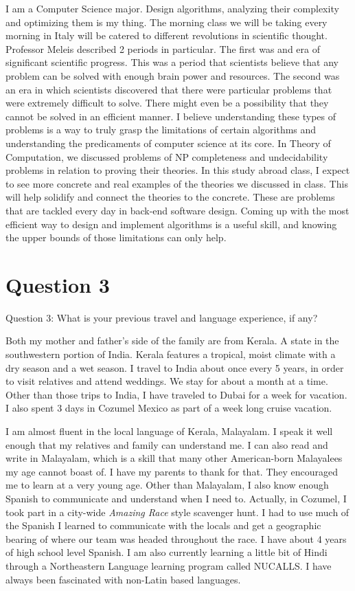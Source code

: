 \documentclass{article}
\begin{document}
I am a Computer Science major. Design algorithms, analyzing their complexity and
optimizing them is my thing. The morning class we will be taking every morning
in Italy will be catered to different revolutions in  scientific thought.
Professor Meleis described 2 periods in particular. The first was and era of
significant scientific progress. This was a period that scientists believe that
any problem can be solved with enough brain power and resources. The second was
an era in which scientists discovered that there were particular problems that
were extremely difficult to solve. There might even be a possibility that they
cannot be solved in an efficient manner. I believe understanding these types of
problems is a way to truly grasp the limitations of certain algorithms and
understanding the predicaments of computer science at its core. In Theory of
Computation, we discussed problems of NP completeness and undecidability
problems in relation to proving their theories. In this study abroad class, I
expect to see more concrete and real examples of the theories we discussed in
class. This will help solidify and connect the theories to the concrete. These
are problems that are tackled every day in back-end software design. Coming up
with the most efficient way to design and implement algorithms is a useful
skill, and knowing the upper bounds of those limitations can only help. 

\section{Question 3} Question 3: What is your previous travel and language
experience, if any?

Both my mother and father's side of the family are from Kerala. A state in the
southwestern portion of India. Kerala features a tropical, moist climate with a
dry season and a wet season. I travel to India about once every 5 years, in
order to visit relatives and attend weddings. We stay for about a month at a
time. Other than those trips to India, I have traveled to Dubai for a week for
vacation. I also spent 3 days in Cozumel Mexico as part of a week long cruise
vacation.

I am almost fluent in the local language of Kerala, Malayalam. I speak it well
enough that my relatives and family can understand me. I can also read and write
in Malayalam, which is a skill that many other American-born Malayalees my age
cannot boast of. I have my parents to thank for that. They encouraged me to
learn at a very young age. Other than Malayalam, I also know enough Spanish to
communicate and understand when I need to. Actually, in Cozumel, I took part in
a city-wide \textit{Amazing Race} style scavenger hunt. I had to use much of the
Spanish I learned to communicate with the locals and get a geographic bearing of
where our team was headed throughout the race. I have about 4 years of high
school level Spanish. I am also currently learning a little bit of Hindi through
a Northeastern Language learning program called NUCALLS. I have always been
fascinated with non-Latin based languages. 
\end{document}
